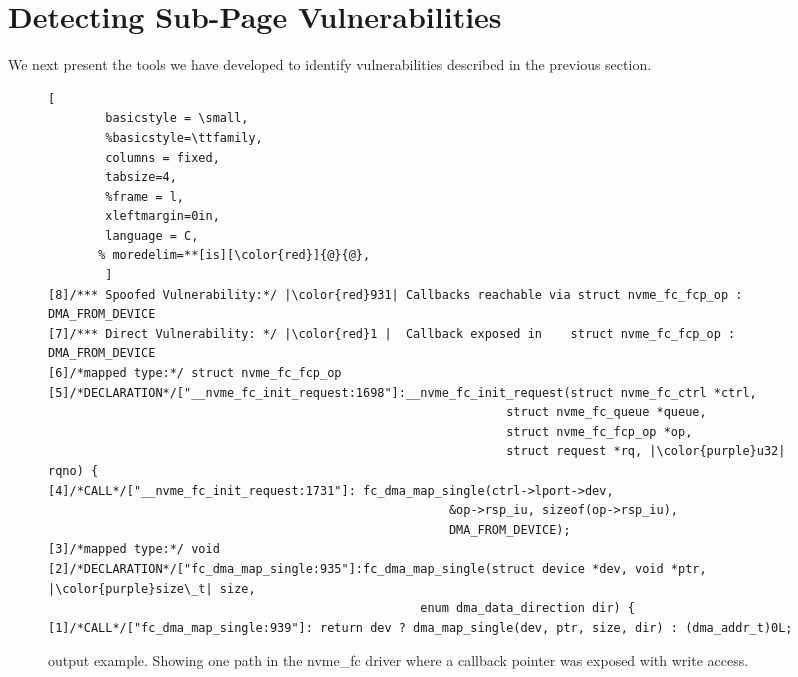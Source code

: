 \section{Detecting Sub-Page Vulnerabilities}
We next present the tools we have developed to identify \subpage vulnerabilities described in the previous section.

\begin{figure*}[t]
\begin{adjustbox}{width=\linewidth}
        \begin{lstlisting}[
        basicstyle = \small,
        %basicstyle=\ttfamily,
        columns = fixed,
        tabsize=4,
        %frame = l,
        xleftmargin=0in,
        language = C,
       % moredelim=**[is][\color{red}]{@}{@},
        ]
[8]/*** Spoofed Vulnerability:*/ |\color{red}931| Callbacks reachable via struct nvme_fc_fcp_op : DMA_FROM_DEVICE
[7]/*** Direct Vulnerability: */ |\color{red}1 |  Callback exposed in    struct nvme_fc_fcp_op : DMA_FROM_DEVICE
[6]/*mapped type:*/ struct nvme_fc_fcp_op
[5]/*DECLARATION*/["__nvme_fc_init_request:1698"]:__nvme_fc_init_request(struct nvme_fc_ctrl *ctrl,
                                                                struct nvme_fc_queue *queue, 
                                                                struct nvme_fc_fcp_op *op, 
                                                                struct request *rq, |\color{purple}u32| rqno) {
[4]/*CALL*/["__nvme_fc_init_request:1731"]: fc_dma_map_single(ctrl->lport->dev,
                                                        &op->rsp_iu, sizeof(op->rsp_iu),
                                                        DMA_FROM_DEVICE);
[3]/*mapped type:*/ void
[2]/*DECLARATION*/["fc_dma_map_single:935"]:fc_dma_map_single(struct device *dev, void *ptr, |\color{purple}size\_t| size, 
                                                    enum dma_data_direction dir) {
[1]/*CALL*/["fc_dma_map_single:939"]: return dev ? dma_map_single(dev, ptr, size, dir) : (dma_addr_t)0L;

                \end{lstlisting}
\end{adjustbox}
        \caption{\tool output example. Showing one path in the nvme\_fc driver where a callback pointer was exposed with write access.}
        \label{fig:tool_example}

\end{figure*}

